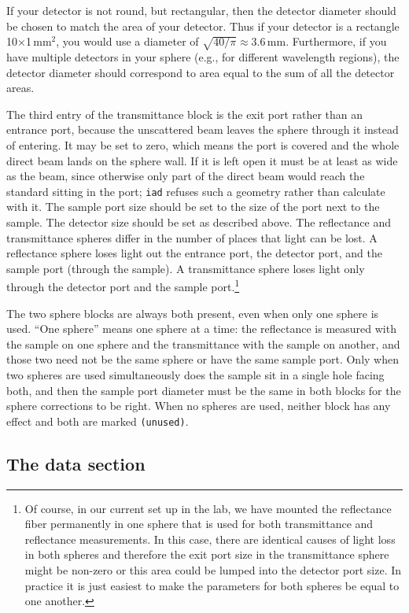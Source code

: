 \documentclass{article}
\newcommand\iadprog{\texttt{iad}}
\begin{document}
If your detector is not round, but rectangular, then the detector diameter should 
be chosen to match the area of your detector.  Thus if your detector is a rectangle
10$\times$1\,mm$^2$, you would use a diameter of $\sqrt{40/\pi}\approx3.6$\,mm.
Furthermore, if you have multiple detectors in your sphere (e.g., for different wavelength
regions), the detector diameter should correspond to area equal to the sum of all
the detector areas.  

The third entry of the transmittance block is the exit port rather than an
entrance port, because the unscattered beam leaves the sphere through it
instead of entering.  It may be set to zero, which means the port is covered
and the whole direct beam lands on the sphere wall.  If it is left open it
must be at least as wide as the beam, since otherwise only part of the direct
beam would reach the standard sitting in the port; \iadprog{} refuses such a
geometry rather than calculate with it.  The sample port size should
be set to the size of the port next to the sample.  The detector size should be set
as described above.  The reflectance and transmittance spheres differ in the number
of places that light can be lost.  A reflectance sphere loses light out the entrance
port, the detector port, and the sample port (through the sample).  A transmittance
sphere loses light only through the detector port and the sample port.\footnote[1]{Of
course, in our current set up in the lab, we have mounted the reflectance fiber
permanently in one sphere that is used for both transmittance and reflectance
measurements.  In this case, there are identical causes of light loss in both
spheres and therefore the exit port size in the transmittance sphere might
be non-zero or this area could be lumped into the detector port size.  In practice
it is just easiest to make the parameters for both spheres be equal to one another.}

The two sphere blocks are always both present, even when only one sphere is
used.  ``One sphere'' means one sphere at a time: the reflectance is measured
with the sample on one sphere and the transmittance with the sample on another,
and those two need not be the same sphere or have the same sample port.  Only
when two spheres are used simultaneously does the sample sit in a single hole
facing both, and then the sample port diameter must be the same in both blocks
for the sphere corrections to be right.  When no spheres are used, neither
block has any effect and both are marked \texttt{(unused)}.


\subsection{The data section}
\end{document}
